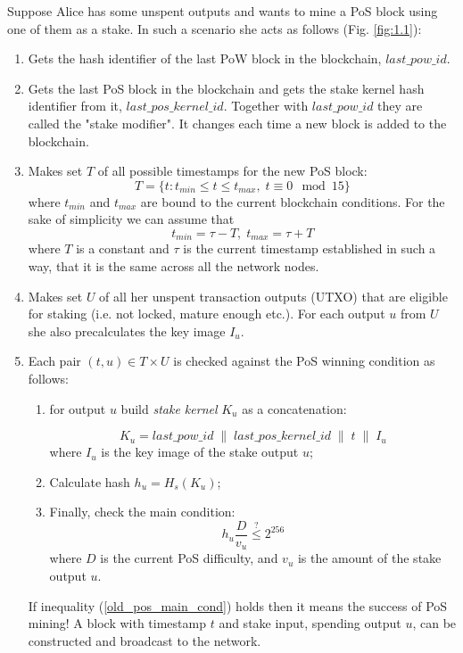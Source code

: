 \documentclass{article}
\numberwithin{figure}{section}
\begin{document}
\indent
Suppose Alice has some unspent outputs and wants to mine a PoS block using one of them as a stake. In such a scenario she acts as follows (Fig. \ref{fig:1.1}):

\begin{enumerate}
\item Gets the hash identifier of the last PoW block in the blockchain, $last\_pow\_id$.

\item Gets the last PoS block in the blockchain and gets the stake kernel hash identifier from it, $last\_pos\_kernel\_id$. Together with $last\_pow\_id$ they are called the "stake modifier". It changes each time a new block is added to the blockchain. 

\item Makes set $T$ of all possible timestamps for the new PoS block:
\[ T = \{t : t_{min} \leq t \leq t_{max}, \; t \equiv 0 \mod{15} \} \]
where $t_{min}$ and $t_{max}$ are bound to the current blockchain conditions. For the sake of simplicity we can assume that
\[ t_{min} = \tau - T, \; t_{max} = \tau + T \]
where $T$ is a constant and $\tau$ is the current timestamp established in such a way, that it is the same across all the network nodes.

\item Makes set $U$ of all her unspent transaction outputs (UTXO) that are eligible for staking (i.e. not locked, mature enough etc.). For each output $u$ from $U$ she also precalculates the key image $I_u$.

\item Each pair $(t, u) \in T \times U$ is checked against the PoS winning condition as follows:

    \begin{enumerate}
    \item for output $u$ build \textit{stake kernel} $K_u$ as a concatenation:

    \[ K_u = last\_pow\_id \;\|\; last\_pos\_kernel\_id \;\|\; t \;\|\; I_u \]
    where $I_u$ is the key image of the stake output $u$;
    
    \item Calculate hash $h_u = H_s(K_u)$;
    
    \item Finally, check the main condition:
    \begin{equation} \label{old_pos_main_cond}
    h_u \frac{D}{v_u} \stackrel{?}{\leq} 2^{256} \end{equation} 
    where $D$ is the current PoS difficulty, and $v_u$ is the amount of the stake output $u$. 
    
    \end{enumerate}
    
    If inequality (\ref{old_pos_main_cond}) holds then it means the success of PoS mining! A block with timestamp $t$ and stake input, spending output $u$, can be constructed and broadcast to the network.
    
\end{enumerate}
\end{document}
